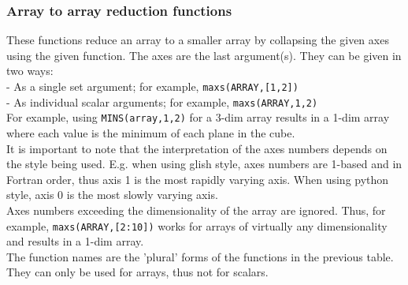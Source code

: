 \subsubsection{Array to array reduction functions}
These functions reduce an array to a smaller array by collapsing
the given axes using the given function. The axes are the last argument(s).
They can be given in two ways:
\\- As a single set argument; for example, \texttt{maxs(ARRAY,[1,2])}
\\- As individual scalar arguments; for example, \texttt{maxs(ARRAY,1,2)}
\\For example, using
\texttt{MINS(array,1,2)} for a 3-dim array results in a 1-dim array
where each value is the minimum of each plane in the cube.
\\It is important to note that the interpretation of the axes numbers
depends on the style being used. E.g. when using glish style, axes numbers are
1-based and in Fortran order, thus axis 1 is the most rapidly varying
axis. When using python style, axis 0 is the most slowly varying axis.
\\Axes numbers exceeding the dimensionality of the array are ignored.
Thus, for example, \texttt{maxs(ARRAY,[2:10])} works for arrays
of virtually any dimensionality and results in a 1-dim array.
\\The function names are the 'plural' forms of the
functions in the previous table.
They can only be used for arrays, thus not for scalars.
